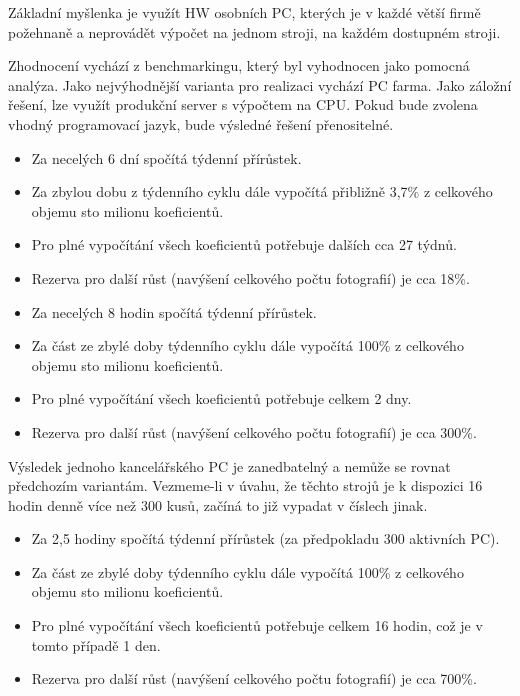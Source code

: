 Základní myšlenka je využít HW osobních PC, kterých je v každé větší firmě požehnaně a neprovádět výpočet na jednom stroji, na každém dostupném stroji.

Zhodnocení vychází z benchmarkingu, který byl vyhodnocen jako pomocná analýza. Jako nejvýhodnější varianta pro realizaci vychází PC farma. Jako záložní řešení, lze využít produkční server s výpočtem na CPU. Pokud bude zvolena vhodný programovací jazyk, bude výsledné řešení přenositelné.

\begin{itemize}
	\setlength{\parskip}{0pt}
	\setlength{\itemsep}{0pt}
	\item {Za necelých 6 dní spočítá týdenní přírůstek.}
	\item {Za zbylou dobu z týdenního cyklu dále vypočítá přibližně 3,7\% z celkového objemu sto milionu koeficientů.}
	\item {Pro plné vypočítání všech koeficientů potřebuje dalších cca 27 týdnů.}
	\item {Rezerva pro další růst (navýšení celkového počtu fotografií) je cca 18\%.}
\end{itemize}

\begin{itemize}
	\setlength{\parskip}{0pt}
	\setlength{\itemsep}{0pt}
	\item {Za necelých 8 hodin spočítá týdenní přírůstek.}
	\item {Za část ze zbylé doby týdenního cyklu dále vypočítá 100\% z celkového objemu sto milionu koeficientů.}
	\item {Pro plné vypočítání všech koeficientů potřebuje celkem 2 dny.}
	\item {Rezerva pro další růst (navýšení celkového počtu fotografií) je cca 300\%.}
\end{itemize}

Výsledek jednoho kancelářského PC je zanedbatelný a nemůže se rovnat předchozím variantám. Vezmeme-li v úvahu, že těchto strojů je k dispozici 16 hodin denně více než 300 kusů, začíná to již vypadat v číslech jinak.

\begin{itemize}
	\setlength{\parskip}{0pt}
	\setlength{\itemsep}{0pt}
	\item {Za 2,5 hodiny spočítá týdenní přírůstek (za předpokladu 300 aktivních PC).}
	\item {Za část ze zbylé doby týdenního cyklu dále vypočítá 100\% z celkového objemu sto milionu koeficientů.}
	\item {Pro plné vypočítání všech koeficientů potřebuje celkem 16 hodin, což je v tomto případě 1 den.}
	\item {Rezerva pro další růst (navýšení celkového počtu fotografií) je cca 700\%.}
\end{itemize}

